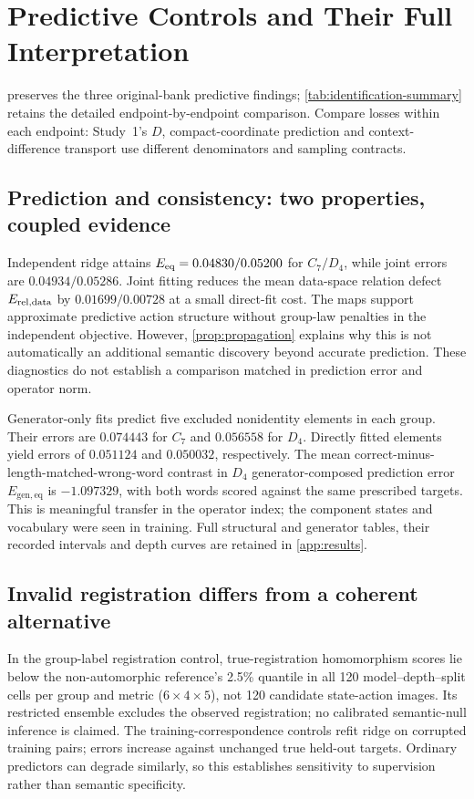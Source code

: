 \section{Predictive Controls and Their Full Interpretation}
\label{app:predictive-controls}
 preserves the three original-bank predictive findings; \cref{tab:identification-summary} retains the detailed endpoint-by-endpoint comparison. Compare losses within each endpoint: Study~1's $D$, compact-coordinate prediction and context-difference transport use different denominators and sampling contracts.



\subsection{Prediction and consistency: two properties, coupled evidence}
Independent ridge attains $E_{\mathrm{eq}}=0.04830/0.05200$ for $C_7/D_4$, while joint errors are $0.04934/0.05286$. Joint fitting reduces the mean data-space relation defect $E_{\mathrm{rel,data}}$ by $0.01699/0.00728$ at a small direct-fit cost. The maps support approximate predictive action structure without group-law penalties in the independent objective. However, \cref{prop:propagation} explains why this is not automatically an additional semantic discovery beyond accurate prediction. These diagnostics do not establish a comparison matched in prediction error and operator norm.

Generator-only fits predict five excluded nonidentity elements in each group. Their errors are $0.074443$ for $C_7$ and $0.056558$ for $D_4$. Directly fitted elements yield errors of $0.051124$ and $0.050032$, respectively. The mean correct-minus-length-matched-wrong-word contrast in $D_4$ generator-composed prediction error $E_{\mathrm{gen,eq}}$ is $-1.097329$, with both words scored against the same prescribed targets. This is meaningful transfer in the operator index; the component states and vocabulary were seen in training. Full structural and generator tables, their recorded intervals and depth curves are retained in \cref{app:results}.

\subsection{Invalid registration differs from a coherent alternative}
In the group-label registration control, true-registration homomorphism scores lie below the non-automorphic reference's 2.5\% quantile in all 120 model--depth--split cells per group and metric ($6\times4\times5$), not 120 candidate state-action images. Its restricted ensemble excludes the observed registration; no calibrated semantic-null inference is claimed. The training-correspondence controls refit ridge on corrupted training pairs; errors increase against unchanged true held-out targets. Ordinary predictors can degrade similarly, so this establishes sensitivity to supervision rather than semantic specificity.

